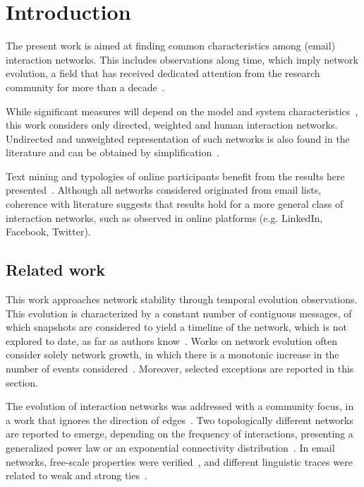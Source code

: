 \documentclass[%
 aip,
 jmp,%
 amsmath,amssymb,
 reprint,%
]{revtex4-1}
\begin{document}
\section{\label{sec:into}Introduction}
The present work is aimed at finding common characteristics among (email) interaction networks. This includes observations along time, which imply network evolution, a field that has received dedicated attention from the research community
for more than a decade~\cite{barabasiEvo,newmanEvolving}.

While significant measures will depend on the model and system characteristics~\cite{newmanStru, newmanWeight},
this work considers only directed, weighted and human interaction networks. Undirected and unweighted representation of such networks is also found in the literature and can be obtained by simplification~\cite{GMANE2}.

Text mining and typologies of online participants benefit from the results here presented~\cite{rcText,rcTipo}. 
Although all networks considered originated from email lists,
 coherence with literature suggests that results hold for a more general class of interaction networks,
 such as observed in online platforms (e.g. LinkedIn, Facebook, Twitter).


\subsection{Related work}
This work approaches network stability through temporal evolution observations.
This evolution is characterized by a constant number of contiguous messages, of which snapshots are considered to yield a timeline of the network, which is not explored to date, as far as authors know~\cite{netWindowEvo}.
 Works on network evolution often consider solely network growth, in which there is a monotonic increase in the number of events considered~\cite{barabasiEvo}. Moreover, selected exceptions are reported in this section.

 The evolution of interaction networks was addressed with a community focus, in a work that ignores the direction of edges~\cite{barabasiEvo}. Two topologically different networks are reported to emerge, depending on the frequency of interactions, presenting a generalized power law or an exponential connectivity distribution~\cite{barabasiTopologicalEv}. 
In email networks, free-scale properties were verified~\cite{bird}, and different linguistic traces were related to weak and strong ties~\cite{GMANE2}.
\end{document}
